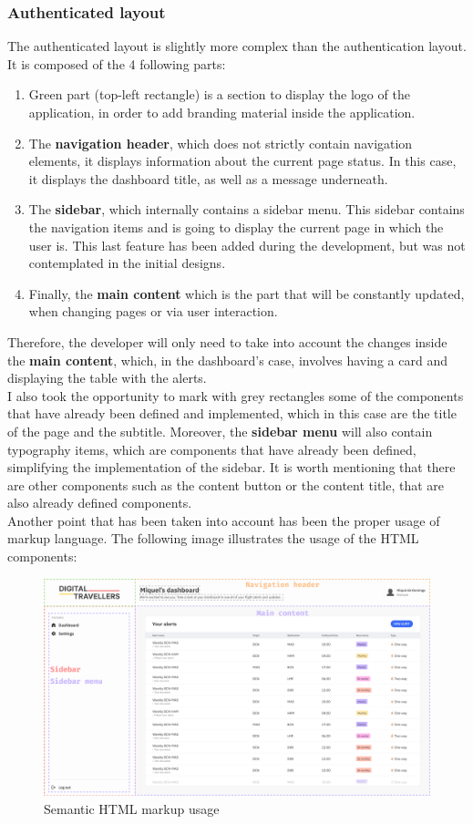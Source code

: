 \documentclass[./memory.tex]{subfiles}
\begin{document}
\subsubsection{Authenticated layout}
The authenticated layout is slightly more complex than the authentication
layout. It is composed of the 4 following parts:
\begin{enumerate}[label = -]
	\item Green part (top-left rectangle) is a section to display the logo of the
	      application, in order to add branding material inside the application.
	\item The \textbf{navigation header}, which does not strictly contain
	      navigation elements, it displays information about the current page status.
	      In this case, it displays the dashboard title, as well as a message
	      underneath.
	\item The \textbf{sidebar}, which internally contains a sidebar menu. This
	      sidebar contains the navigation items and is going to display the current
	      page in which the user is. This last feature has been added during the
	      development, but was not contemplated in the initial designs.
	\item Finally, the \textbf{main content} which is the part that will be
	      constantly updated, when changing pages or via user interaction.
\end{enumerate}
Therefore, the developer will only need to take into account the changes inside
the \textbf{main content}, which, in the dashboard's case, involves having a
card and displaying the table with the alerts.
\\[8pt]
I also took the opportunity to mark with grey rectangles some of the components
that have already been defined and implemented, which in this case are the title
of the page and the subtitle. Moreover, the \textbf{sidebar menu} will also
contain typography items, which are components that have already been defined,
simplifying the implementation of the sidebar. It is worth mentioning that there
are other components such as the content button or the content title, that are
also already defined components.
\\[8pt]
Another point that has been taken into account has been the proper usage of
markup language. The following image illustrates the usage of the HTML
components:
\begin{figure}[H]
	\centering
	\includegraphics[width=\textwidth]{./assets/designs/dashboard-layout-web.png}
	\caption{Semantic HTML markup usage}
\end{figure}
\end{document}
